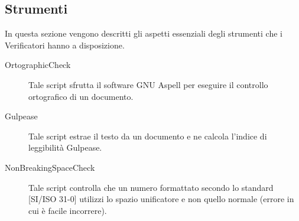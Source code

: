 	\subsection{Strumenti}
		In questa sezione vengono descritti gli aspetti essenziali degli strumenti che i Verificatori hanno a disposizione.
		\begin{description}
			\item[OrtographicCheck] Tale script sfrutta il software GNU Aspell per eseguire il controllo ortografico di un documento.
			\item[Gulpease] Tale script estrae il testo da un documento e ne calcola l'indice di leggibilità Gulpease.
			\item[NonBreakingSpaceCheck] Tale script controlla che un numero formattato secondo lo standard [SI/ISO 31-0] utilizzi lo spazio unificatore 
			e non quello normale (errore in cui è facile incorrere).
		\end{description}